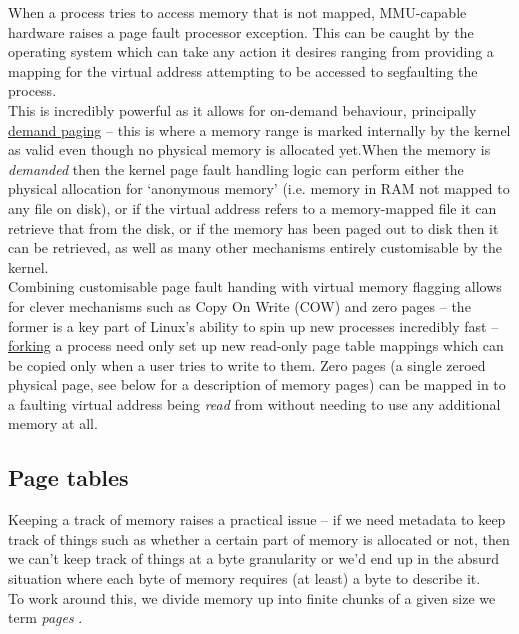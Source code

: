 When a process tries to access memory that is not mapped, MMU-capable hardware
raises a  page fault processor exception. This can be caught
by the operating system which can take any action it desires ranging from
providing a mapping for the virtual address attempting to be accessed to
segfaulting the process.\\

This is incredibly powerful as it allows for on-demand behaviour, principally
\href{https://en.wikipedia.org/wiki/Demand_paging}{demand paging} -- this is
where a memory range is marked internally by the kernel as valid even though no
physical memory is allocated yet.When the memory is \emph{demanded} then the
kernel page fault handling logic can perform either the physical allocation for
`anonymous memory'  (i.e. memory in RAM not mapped to
any file on disk), or if the virtual address refers to a memory-mapped file it
can retrieve that from the disk, or if the memory has been paged out to disk
then it can be retrieved, as well as many other mechanisms entirely customisable
by the kernel.\\

Combining customisable page fault handing with virtual memory flagging allows
for clever mechanisms such as  Copy On Write (COW) and
 zero pages -- the former is a key part of Linux's ability to
spin up new processes incredibly fast -- 
\href{https://en.wikipedia.org/wiki/Fork_(system_call)}{forking} a process need
only set up new read-only page table mappings which can be copied only when a
user tries to write to them. Zero pages (a single zeroed physical page, see
below for a description of memory pages) can be mapped in to a faulting virtual
address being \emph{read} from without needing to use any additional memory at
all.\\

\subsection{Page tables}
 Keeping a track of memory raises a practical issue -- if we
need metadata to keep track of things such as whether a certain part of memory
is allocated or not, then we can't keep track of things at a byte granularity or
we'd end up in the absurd situation where each byte of memory requires (at
least) a byte to describe it.\\

To work around this, we divide memory up into finite chunks of a given size we
term \emph{pages} .\\

